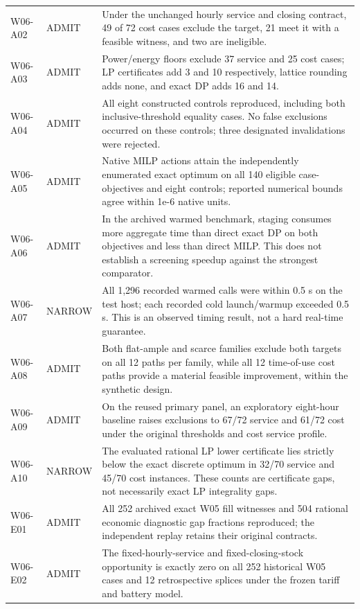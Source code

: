 \documentclass[11pt,letterpaper]{article}
\begin{document}
\begin{longtable}{P{.12\linewidth}P{.12\linewidth}P{.66\linewidth}}
W06-A02 & ADMIT & Under the unchanged hourly service and closing contract, 49 of 72 cost cases exclude the target, 21 meet it with a feasible witness, and two are ineligible.\\
W06-A03 & ADMIT & Power/energy floors exclude 37 service and 25 cost cases; LP certificates add 3 and 10 respectively, lattice rounding adds none, and exact DP adds 16 and 14.\\
W06-A04 & ADMIT & All eight constructed controls reproduced, including both inclusive-threshold equality cases. No false exclusions occurred on these controls; three designated invalidations were rejected.\\
W06-A05 & ADMIT & Native MILP actions attain the independently enumerated exact optimum on all 140 eligible case-objectives and eight controls; reported numerical bounds agree within 1e-6 native units.\\
W06-A06 & ADMIT & In the archived warmed benchmark, staging consumes more aggregate time than direct exact DP on both objectives and less than direct MILP. This does not establish a screening speedup against the strongest comparator.\\
W06-A07 & NARROW & All 1,296 recorded warmed calls were within 0.5 s on the test host; each recorded cold launch/warmup exceeded 0.5 s. This is an observed timing result, not a hard real-time guarantee.\\
W06-A08 & ADMIT & Both flat-ample and scarce families exclude both targets on all 12 paths per family, while all 12 time-of-use cost paths provide a material feasible improvement, within the synthetic design.\\
W06-A09 & ADMIT & On the reused primary panel, an exploratory eight-hour baseline raises exclusions to 67/72 service and 61/72 cost under the original thresholds and cost service profile.\\
W06-A10 & NARROW & The evaluated rational LP lower certificate lies strictly below the exact discrete optimum in 32/70 service and 45/70 cost instances. These counts are certificate gaps, not necessarily exact LP integrality gaps.\\
W06-E01 & ADMIT & All 252 archived exact W05 fill witnesses and 504 rational economic diagnostic gap fractions reproduced; the independent replay retains their original contracts.\\
W06-E02 & ADMIT & The fixed-hourly-service and fixed-closing-stock opportunity is exactly zero on all 252 historical W05 cases and 12 retrospective splices under the frozen tariff and battery model.\\

\end{longtable}
\end{document}
